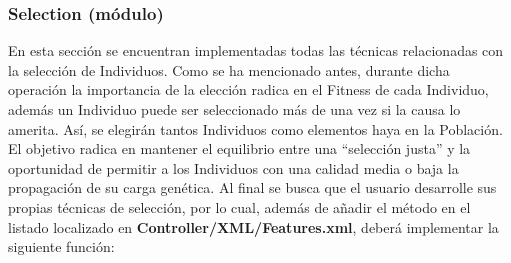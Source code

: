 \documentclass[class=report, crop=false]{standalone}
\begin{document}
\subsubsection{Selection (módulo)}
\label{sec:a_2_4_1}
En esta sección se encuentran implementadas todas las técnicas 
relacionadas con la selección de Individuos.\break
Como se ha mencionado antes, durante dicha operación la 
importancia de la elección radica en el Fitness de cada Individuo, 
además un Individuo puede ser seleccionado más de una vez si la 
causa lo amerita.\break
Así, se elegirán tantos Individuos como elementos haya en la Población.\medskip\break
El objetivo radica en mantener el equilibrio entre una ``selección justa'' y
la oportunidad de permitir a los Individuos con una calidad media o baja 
la propagación de su carga genética.\medskip\break
Al final se busca que el usuario desarrolle sus propias técnicas de 
selección, por lo cual, además de añadir el método en el listado 
localizado en \textbf{Controller/XML/Features.xml}, deberá implementar 
la siguiente función:
\end{document}
